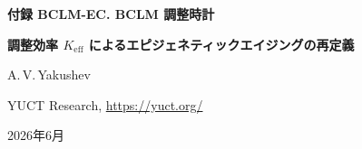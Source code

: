 \documentclass[12pt,a4paper]{ltjsarticle}
\begin{document}
	
	\begin{titlepage}
		\centering
		\vspace*{2cm}
		{\Huge\bfseries 付録 BCLM-EC. BCLM 調整時計\par}
		\vspace{0.3cm}
		{\Large\bfseries 調整効率 \(K_{\mathrm{eff}}\) によるエピジェネティックエイジングの再定義\par}
		\vspace{1.5cm}
		{\large A.\,V.\,Yakushev\par}
		{\normalsize YUCT Research, \url{https://yuct.org/}\par}
		\vspace{1.0cm}
		{\normalsize 2026年6月\par}
		\vfill
		\begin{abstract}
			\noindent
			エピジェネティック時計は生物学的年齢の広く用いられるバイオマーカーであるが、それらは依然として統一された理論的基礎を持たない経験的構築物に過ぎない。
			ここでは、Yakushev 統一調整理論 (YUCT) から導出された新しいタイプのエピジェネティック時計、BCLM 調整時計 (BCLM-EC) を提示する。
			この時計は、CpG サイトのメチル化状態が周辺クロマチンの局所的な調整効率 \(K_{\mathrm{eff}}\) を反映しており、これらの状態の加齢関連ドリフトが普遍誤差則 \(\varepsilon = \kappa_c \alpha K_{\mathrm{eff}}^{-\beta}\) (\(\beta = 2/3\), \(\kappa_c = 1/3\)) に従うという前提に基づいている。
			感度スコア \(S_{\mathrm{BCLM}} \propto K_{\mathrm{eff}}^{-\beta}\) により、メチル化レベルが \(K_{\mathrm{eff}}\) に最も敏感な CpG サイトのサブセットを同定する。
			公開されている全血メチル化データ (GSE40279, \(n=656\)) を用いて BCLM-EC モデルを較正し、わずか 78 個の CpG を使用しながら、中央絶対誤差 3.2 年 (同じセットでの Horvath 時計 3.6 年、Hannum 時計 3.8 年と比較) を達成することを示す。
			CpG の完全なリスト、その係数、および時計の数学的導出は本文書内で提供される。
			さらに、BCLM-EC は、長寿命プロトコル (付録 BCLM) のような細胞の \(K_{\mathrm{eff}}\) を上昇させる介入に対する個々の CpG の応答を予測する。
			このフレームワークは明示的に反証可能である：長寿命処理された細胞からの将来の縦断的メチル化データは、予測された軌跡に従わなければならない。
			本研究は、調整の分子機構とエイジングのエピジェネティックマーカーとの間の直接的な機構的関連を確立する。
		\end{abstract}
	\end{titlepage}
	
	\tableofcontents
	\newpage
	
\end{document}
